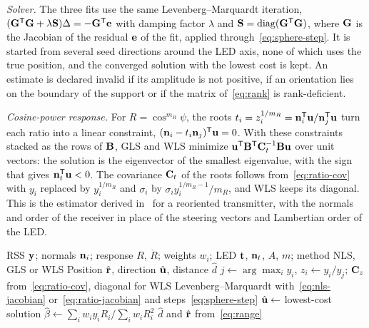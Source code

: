 \emph{Solver.} The three fits use the same Levenberg--Marquardt iteration, $(\mathbf{G}^{\mathsf T}\mathbf{G}+\lambda\mathbf{S})\Delta=-\mathbf{G}^{\mathsf T}\mathbf{e}$ with damping factor $\lambda$ and $\mathbf{S}=\operatorname{diag}(\mathbf{G}^{\mathsf T}\mathbf{G})$, where $\mathbf{G}$ is the Jacobian of the residual $\mathbf{e}$ of the fit, applied through~\eqref{eq:sphere-step}. It is started from several seed directions around the LED axis, none of which uses the true position, and the converged solution with the lowest cost is kept. An estimate is declared invalid if its amplitude is not positive, if an orientation lies on the boundary of the support or if the matrix of~\eqref{eq:rank} is rank-deficient.



\emph{Cosine-power response.} For $R=\cos^{m_R}\psi$, the roots $t_i=z_i^{1/m_R}=\mathbf{n}_i^{\mathsf T}\mathbf{u}/\mathbf{n}_j^{\mathsf T}\mathbf{u}$ turn each ratio into a linear constraint, $(\mathbf{n}_i-t_i\mathbf{n}_j)^{\mathsf T}\mathbf{u}=0$. With these constraints stacked as the rows of $\mathbf{B}$, GLS and WLS minimize $\mathbf{u}^{\mathsf T}\mathbf{B}^{\mathsf T}\mathbf{C}_t^{-1}\mathbf{B}\mathbf{u}$ over unit vectors: the solution is the eigenvector of the smallest eigenvalue, with the sign that gives $\mathbf{n}_t^{\mathsf T}\mathbf{u}<0$. The covariance $\mathbf{C}_t$ of the roots follows from~\eqref{eq:ratio-cov} with $y_i$ replaced by $y_i^{1/m_R}$ and $\sigma_i$ by $\sigma_iy_i^{1/m_R-1}/m_R$, and WLS keeps its diagonal. This is the estimator derived in~\cite{Acuna2026} for a reoriented transmitter, with the normals and order of the receiver in place of the steering vectors and Lambertian order of the LED.

\begin{algorithm}[!t]
 \caption[Position estimate]{Position Estimate From the $K$ RSS}
 \label{alg:estimator}
 \small
 \begin{algorithmic}[1]
  \Require RSS $\mathbf{y}$; normals $\mathbf{n}_i$; response $R$, $\dot R$; weights $w_i$; LED $\mathbf{t}$, $\mathbf{n}_t$, $A$, $m$; method NLS, GLS or WLS
  \Ensure Position $\hat{\mathbf{r}}$, direction $\hat{\mathbf{u}}$, distance $\hat d$
   \State $j\gets\arg\max_iy_i$, $z_i\gets y_i/y_j$; $\mathbf{C}_z$ from~\eqref{eq:ratio-cov}, diagonal for WLS
  \EndIf
   \State Levenberg--Marquardt with~\eqref{eq:nls-jacobian} or~\eqref{eq:ratio-jacobian} and steps~\eqref{eq:sphere-step}
  \EndFor
  \State $\hat{\mathbf{u}}\gets$ lowest-cost solution
  \State $\hat\beta\gets\sum_iw_iy_iR_i/\sum_iw_iR_i^2$
  \State $\hat d$ and $\hat{\mathbf{r}}$ from~\eqref{eq:range}
 \end{algorithmic}
\end{algorithm}
